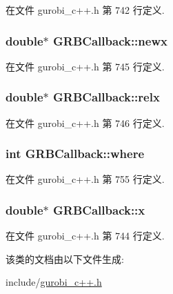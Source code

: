 在文件 gurobi\+\_\+c++.\+h 第 742 行定义.

\subsubsection[{\texorpdfstring{newx}{newx}}]{\setlength{\rightskip}{0pt plus 5cm}double$\ast$ G\+R\+B\+Callback\+::newx\hspace{0.3cm}{\ttfamily [private]}}\hypertarget{classGRBCallback_ad4d2d0181047f6cbc91775f09da1b44e}{}\label{classGRBCallback_ad4d2d0181047f6cbc91775f09da1b44e}


在文件 gurobi\+\_\+c++.\+h 第 745 行定义.

\subsubsection[{\texorpdfstring{relx}{relx}}]{\setlength{\rightskip}{0pt plus 5cm}double$\ast$ G\+R\+B\+Callback\+::relx\hspace{0.3cm}{\ttfamily [private]}}\hypertarget{classGRBCallback_a345d6000f8cd0b97e59d6dc1f908250c}{}\label{classGRBCallback_a345d6000f8cd0b97e59d6dc1f908250c}


在文件 gurobi\+\_\+c++.\+h 第 746 行定义.

\subsubsection[{\texorpdfstring{where}{where}}]{\setlength{\rightskip}{0pt plus 5cm}int G\+R\+B\+Callback\+::where\hspace{0.3cm}{\ttfamily [protected]}}\hypertarget{classGRBCallback_ac3a80ef6ca81a5503751de0555281fa9}{}\label{classGRBCallback_ac3a80ef6ca81a5503751de0555281fa9}


在文件 gurobi\+\_\+c++.\+h 第 755 行定义.

\subsubsection[{\texorpdfstring{x}{x}}]{\setlength{\rightskip}{0pt plus 5cm}double$\ast$ G\+R\+B\+Callback\+::x\hspace{0.3cm}{\ttfamily [private]}}\hypertarget{classGRBCallback_a3e658eed900f01b7f77e931b136f5ff7}{}\label{classGRBCallback_a3e658eed900f01b7f77e931b136f5ff7}


在文件 gurobi\+\_\+c++.\+h 第 744 行定义.



该类的文档由以下文件生成\+:\begin{DoxyCompactItemize}
\item 
include/\hyperlink{gurobi__c_09_09_8h}{gurobi\+\_\+c++.\+h}\end{DoxyCompactItemize}
